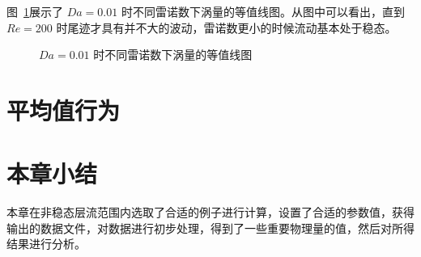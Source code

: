 图~\ref{fig: vorticity-contour-1e-2}展示了 $Da=0.01$ 时不同雷诺数下涡量的等值线图。从图中可以看出，直到 $Re=200$ 时尾迹才具有并不大的波动，雷诺数更小的时候流动基本处于稳态。

\begin{figure}
	\centering
	\begin{minipage}{\textwidth}
		\centering
	\end{minipage}
	\centering
	\begin{minipage}{\textwidth}
		\centering
	\end{minipage}
	\caption{$Da=0.01$ 时不同雷诺数下涡量的等值线图}
	\label{fig: vorticity-contour-1e-2}
\end{figure}

\section{平均值行为}\label{sec: average}

\section{本章小结}

本章在非稳态层流范围内选取了合适的例子进行计算，设置了合适的参数值，获得输出的数据文件，对数据进行初步处理，得到了一些重要物理量的值，然后对所得结果进行分析。
